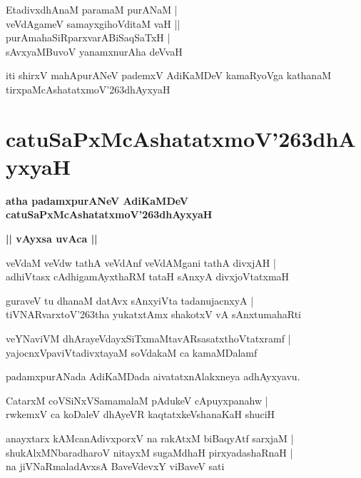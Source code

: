 \documentclass[twoside,12pt,openright]{book}
\def\S{\char'263}
\newcounter{shloka}[chapter]
\def\uvaca#1{\centerline{{\large\textbf{#1}}}}
\begin{document}
\begin{shloka}
EtadivxdhAnaM paramaM purANaM |\\
veVdAgameV samayxgihoVditaM vaH ||\\
purAmahaSiRparxvarABiSaqSaTxH |\\
sAvxyaMBuvoV yanamxnurAha deVvaH
\end{shloka}

\begin{center}
iti shirxV mahApurANeV pademxV AdiKaMDeV kamaRyoVga kathanaM tirxpaMcAshatatxmoV\S dhAyxyaH 
\end{center}

\chapter{catuSaPxMcAshatatxmoV\S dhAyxyaH}

\begin{center}
{\LARGE\bfseries atha padamxpurANeV AdiKaMDeV catuSaPxMcAshatatxmoV\S dhAyxyaH}
\end{center}

\uvaca{|| vAyxsa uvAca ||}

\begin{shloka}
veVdaM veVdw tathA veVdAnf veVdAMgani tathA divxjAH |\\
adhiVtasx cAdhigamAyxthaRM tataH sAnxyA divxjoVtatxmaH
\end{shloka}

\begin{shloka}
guraveV tu dhanaM datAvx sAnxyiVta tadanujacnxyA |\\
tiVNARvarxtoV\S tha yukatxtAmx shakotxV vA sAnxtumahaRti 
\end{shloka}

\begin{shloka}
veYNaviVM dhArayeVdayxSiTxmaMtavARsasatxthoVtatxramf |\\
yajocnxVpaviVtadivxtayaM soVdakaM ca kamaMDalamf 
\end{shloka}

\begin{center}
padamxpurANada AdiKaMDada aivatatxnAlakxneya adhAyxyavu.
\end{center}

\begin{shloka}
CatarxM coVSiNxVSamamalaM pAdukeV cApuyxpanahw |\\
rwkemxV ca koDaleV dhAyeVR kaqtatxkeVshanaKaH shuciH 
\end{shloka}

\begin{shloka}
anayxtarx kAMcanAdivxporxV na rakAtxM biBaqyAtf sarxjaM |\\
shukAlxMNbaradharoV nitayxM sugaMdhaH pirxyadashaRnaH |\\
na jiVNaRmaladAvxsA BaveVdevxY viBaveV sati 
\end{shloka}
\end{document}
